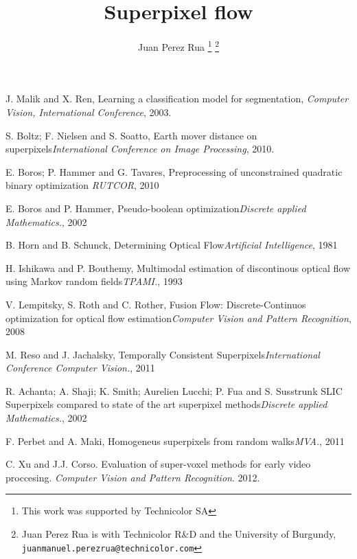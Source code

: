 \documentclass[a4paper, 10pt, conference]{ieeeconf}      %
\title{\LARGE \bf
Superpixel flow
}
\author{Juan Perez Rua%
\thanks{This work was supported by Technicolor SA}%
\thanks{Juan Perez Rua  is with Technicolor R\&D and the University of Burgundy,
        {\tt\small juanmanuel.perezrua@technicolor.com}}%
}
\begin{document}
\maketitle
\thispagestyle{empty}
\pagestyle{empty}







\begin{thebibliography}{99}

J. Malik and X. Ren, Learning a classification model for segmentation, {\it Computer Vision, International Conference}, 2003.

S. Boltz; F. Nielsen and S. Soatto, Earth mover distance on superpixels{\it International Conference on Image Processing}, 2010.

E. Boros; P. Hammer and G. Tavares, Preprocessing of unconstrained quadratic binary optimization {\it RUTCOR}, 2010

E. Boros and P. Hammer, Pseudo-boolean optimization{\it Discrete applied Mathematics.}, 2002

B. Horn and B. Schunck, Determining Optical Flow{\it Artificial Intelligence}, 1981

H. Ishikawa and P. Bouthemy, Multimodal estimation of discontinous optical flow using Markov random fields{\it TPAMI.}, 1993

V. Lempitsky, S. Roth and C. Rother, Fusion Flow: Discrete-Continuos optimization for optical flow estimation{\it Computer Vision and Pattern Recognition}, 2008

M. Reso and J. Jachalsky, Temporally Consistent Superpixels{\it International Conference Computer Vision.}, 2011

R. Achanta; A. Shaji; K. Smith; Aurelien Lucchi; P. Fua and S. Susstrunk SLIC Superpixels compared to state of the art superpixel methods{\it Discrete applied Mathematics.}, 2002

F. Perbet and A. Maki, Homogeneus superpixels from random walks{\it MVA.}, 2011

C. Xu and J.J. Corso. Evaluation of super-voxel methods for early video proccesing. {\it Computer Vision and Pattern Recognition}. 2012.


\end{thebibliography}
\end{document}
